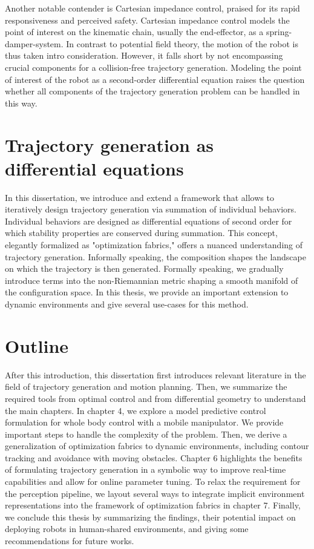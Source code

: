 Another notable contender is Cartesian impedance control,
praised for its rapid responsiveness and perceived safety.
Cartesian impedance control models the point of interest on
the kinematic chain, usually the end-effector, as a
spring-damper-system. In contrast to potential field theory,
the motion of the robot is thus taken intro consideration.
However, it falls short by not encompassing crucial
components for a collision-free trajectory generation.
Modeling the point of interest of the robot as a
second-order differential equation raises the question
whether all components of the trajectory generation problem
can be handled in this way. 

\section{Trajectory generation as differential equations}

In this dissertation, we introduce and extend a framework
that allows to iteratively design trajectory generation via
summation of individual behaviors. Individual behaviors are
designed as differential equations of second order for which
stability properties are conserved during summation.
This concept, elegantly formalized as "optimization
fabrics," offers a nuanced understanding of trajectory
generation. Informally speaking, the composition shapes the
landscape on which the trajectory is then generated.
Formally speaking, we gradually introduce terms into the
non-Riemannian metric shaping a smooth manifold of the
configuration space. In this thesis, we provide an important
extension to dynamic environments and give several use-cases
for this method.


\section{Outline}

After this introduction, this dissertation first introduces
relevant literature in the field of trajectory generation
and motion planning. Then, we summarize the required tools
from optimal control and from differential geometry to
understand the main chapters. In chapter 4, we explore a
model predictive control formulation for whole body control
with a mobile manipulator. We provide important steps to
handle the complexity of the problem. Then, we derive a
generalization of optimization fabrics to dynamic
environments, including contour tracking and avoidance with
moving obstacles. Chapter 6 highlights the benefits of
formulating trajectory generation in a symbolic way to
improve real-time capabilities and allow for online
parameter tuning. To relax the requirement for the
perception pipeline, we layout several ways to integrate
implicit environment representations into the framework of
optimization fabrics in chapter 7. Finally, we conclude this
thesis by summarizing the findings, their potential impact
on deploying robots in human-shared environments, and giving some
recommendations for future works.
